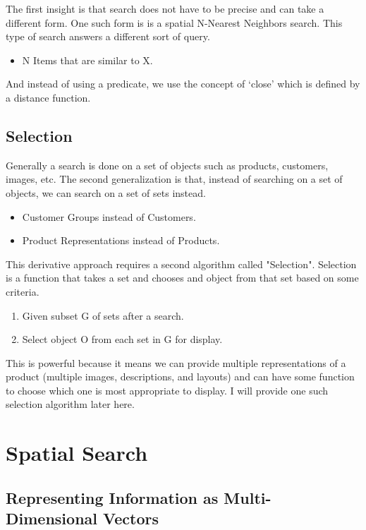 \documentclass[11pt]{article}
\begin{document}
The first insight is that search does not have to be precise and can take a different
form. One such form is is a spatial N-Nearest Neighbors search. This type of search
answers a different sort of query.

\begin{itemize}
    \item N Items that are similar to X.
\end{itemize}

And instead of using a predicate, we use the concept of `close' which is defined
by a distance function.

\subsection{Selection}

Generally a search is done on a set of objects such as products, customers, images, etc.
The second generalization is that, instead of searching on a set of objects, we can search on a 
set of sets instead. 

\begin{itemize}
    \item Customer Groups instead of Customers.
    \item Product Representations instead of Products.
\end{itemize}

This derivative approach requires a second algorithm called "Selection". 
Selection is a function that takes a set and chooses and object from that set
based on some criteria.

\begin{enumerate}
    \item Given subset G of sets after a search. 
    \item Select object O from each set in G for display.
\end{enumerate}

This is powerful because it means we can provide multiple representations of a product
(multiple images, descriptions, and layouts) and can have some function to choose which
one is most appropriate to display. I will provide one such selection algorithm later here.

\section{Spatial Search}
\subsection{Representing Information as Multi-Dimensional Vectors}
\end{document}
